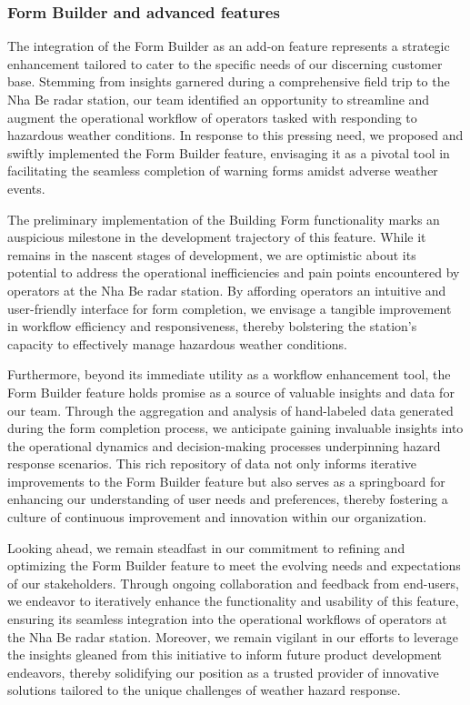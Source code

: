 \subsubsection{Form Builder and advanced features}
The integration of the Form Builder as an add-on feature represents a strategic
enhancement tailored to cater to the specific needs of our discerning customer
base. Stemming from insights garnered during a comprehensive field trip to the
Nha Be radar station, our team identified an opportunity to streamline and
augment the operational workflow of operators tasked with responding to
hazardous weather conditions. In response to this pressing need, we proposed and
swiftly implemented the Form Builder feature, envisaging it as a pivotal tool in
facilitating the seamless completion of warning forms amidst adverse weather
events.

The preliminary implementation of the Building Form functionality marks an
auspicious milestone in the development trajectory of this feature. While it
remains in the nascent stages of development, we are optimistic about its
potential to address the operational inefficiencies and pain points encountered
by operators at the Nha Be radar station. By affording operators an intuitive
and user-friendly interface for form completion, we envisage a tangible
improvement in workflow efficiency and responsiveness, thereby bolstering the
station's capacity to effectively manage hazardous weather conditions.

Furthermore, beyond its immediate utility as a workflow enhancement tool, the
Form Builder feature holds promise as a source of valuable insights and data for
our team. Through the aggregation and analysis of hand-labeled data generated
during the form completion process, we anticipate gaining invaluable insights
into the operational dynamics and decision-making processes underpinning hazard
response scenarios. This rich repository of data not only informs iterative
improvements to the Form Builder feature but also serves as a springboard for
enhancing our understanding of user needs and preferences, thereby fostering a
culture of continuous improvement and innovation within our organization.

Looking ahead, we remain steadfast in our commitment to refining and optimizing
the Form Builder feature to meet the evolving needs and expectations of our
stakeholders. Through ongoing collaboration and feedback from end-users, we
endeavor to iteratively enhance the functionality and usability of this feature,
ensuring its seamless integration into the operational workflows of operators at
the Nha Be radar station. Moreover, we remain vigilant in our efforts to
leverage the insights gleaned from this initiative to inform future product
development endeavors, thereby solidifying our position as a trusted provider of
innovative solutions tailored to the unique challenges of weather hazard
response.

